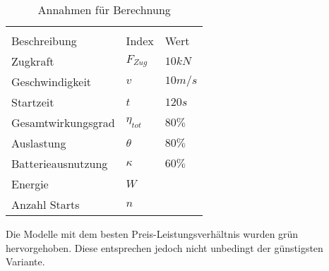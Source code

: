 \begin{table}[H]
	\centering
	\begin{tabular}{C{5cm} C{2.5cm} C{2cm}}
		\\
		{Beschreibung} & {Index} & {Wert} \\ \hline
		Zugkraft    &   $ F_{Zug} $    & $10 kN$   \\
		Geschwindigkeit    &   $ v $    & $10 m/s$   \\
		Startzeit    &   $ t $   & $120 s$   \\
		Gesamtwirkungsgrad    &  $ \eta_{tot} $    & $80\%$   \\
		Auslastung    &  $ \theta $   & $80\%$  \\
		Batterieausnutzung    &  $ \kappa $    & $60\%$   \\
		Energie    &   $ W $    &   \\
		Anzahl Starts    &   $ n $    &    \\	
\end{tabular}
	\caption{Annahmen für Berechnung}
	\label{tab:BerechnungAnzahlStart}
\end{table}








Die Modelle mit dem besten Preis-Leistungsverhältnis wurden grün hervorgehoben. Diese entsprechen jedoch nicht unbedingt der günstigsten Variante.
